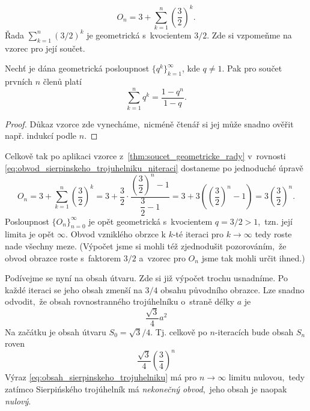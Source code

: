 \begin{equation}\label{eq:obvod_sierpinskeho_trojuhelniku_niteraci}
    O_n=3+\sum_{k=1}^n{\left(\dfrac{3}{2}\right)^k}.
\end{equation}
Řada $\sum_{k=1}^{n}(3/2)^k$ je geometrická s~kvocientem $3/2$. Zde si vzpomeňme na vzorec pro její součet.
\begin{theorem}\label{thm:soucet_geometricke_rady}
    Nechť je dána geometrická posloupnost $\{q^k\}_{k=1}^\infty$, kde $q\neq 1$. Pak pro součet prvních $n$ členů platí
    \begin{equation*}
        \sum_{k=1}^{n}{q^k}=\dfrac{1-q^n}{1-q}.
    \end{equation*}
\end{theorem}
\begin{proof}
    Důkaz vzorce zde vynecháme,~nicméně čtenář si jej může snadno ověřit např. indukcí podle $n$. 
\end{proof}
Celkově tak po aplikaci vzorce z~\ref{thm:soucet_geometricke_rady} v~rovnosti \eqref{eq:obvod_sierpinskeho_trojuhelniku_niteraci} dostaneme po jednoduché úpravě
\begin{equation*}
    O_n=3+\sum_{k=1}^n{\left(\dfrac{3}{2}\right)^k}=3+\dfrac{3}{2}\cdot\dfrac{\left(\dfrac{3}{2}\right)^n-1}{\dfrac{3}{2}-1}=3+3\left(\left(\dfrac{3}{2}\right)^n-1\right)=3\left(\dfrac{3}{2}\right)^n.
\end{equation*}
Posloupnost $\{O_n\}_{n=0}^\infty$ je opět geometrická s~kvocientem $q=3/2>1$,~tzn. její limita je opět $\infty$. Obvod vzniklého obrzce k $k$-té iteraci pro $k\to\infty$ tedy roste nade všechny meze. (Výpočet jsme si mohli též zjednodušit pozorováním,~že obvod obrazce roste s~faktorem $3/2$ a~vzorec pro $O_n$ jsme tak mohli určit ihned.)\par
Podívejme se nyní na obsah útvaru. Zde si již výpočet trochu usnadníme. Po každé iteraci se jeho obsah zmenší na $3/4$ obsahu původního obrazce. Lze snadno odvodit,~že obsah rovnostranného trojúhelníku o~straně délky $a$ je
\begin{equation*}
    \dfrac{\sqrt{3}}{4}a^2
\end{equation*}
Na začátku je obsah útvaru $S_0=\sqrt{3}/4$. Tj. celkově po $n$-iteracích bude obsah $S_n$ roven
\begin{equation}\label{eq:obsah_sierpinskeho_trojuhelniku}
    \dfrac{\sqrt{3}}{4}\left(\dfrac{3}{4}\right)^n
\end{equation}
Výraz \eqref{eq:obsah_sierpinskeho_trojuhelniku} má pro $n\to\infty$ limitu nulovou,~tedy zatímco Sierpińského trojúhelník má \emph{nekonečný obvod},~jeho obsah je naopak \emph{nulový}.

